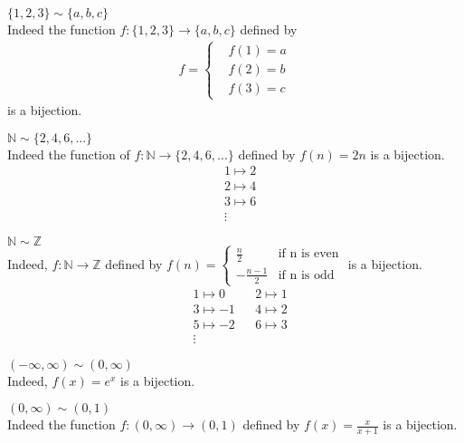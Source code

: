 \begin{example} \leavevmode
    $\{1,2,3\} \sim \{a, b, c\}$ \\
    Indeed the function $f:\{1,2,3\} \rightarrow \{a,b,c\}$ defined by
    \begin{align*}
        f=
        \begin{cases*}
            &f(1)=a \\
            &f(2)=b \\
            &f(3)=c
        \end{cases*}
    \end{align*}
    is a bijection.
\end{example}

\begin{example} \leavevmode
    $\mathbb{N} \sim \{2, 4, 6,...\}$ \\
    Indeed the function of $f:\mathbb{N} \to \{2, 4, 6,...\}$ defined by $f(n)=2n$ is a bijection.
    \begin{align*}
        &1 \mapsto 2 \\
        &2 \mapsto 4 \\
        &3 \mapsto 6\\
        &\vdots
    \end{align*}
\end{example}

\begin{example} \leavevmode
    $\mathbb{N} \sim \mathbb{Z}$ \\
    Indeed, $f: \mathbb{N} \rightarrow \mathbb{Z}$ defined by $f(n)= \begin{cases} \frac{n}{2}&\text{if n is even} \\ -\frac{n-1}{2}&\text{if n is odd} \end{cases}$  is a bijection.
    \begin{align*}
        &1 \mapsto 0 &&2 \mapsto 1 \\
        &3 \mapsto -1 &&4 \mapsto 2 \\
        &5 \mapsto -2 &&6 \mapsto 3 \\
        &\vdots
    \end{align*}
\end{example}

\begin{example} \leavevmode
    $(-\infty, \infty) \sim (0, \infty)$ \\
    Indeed, $f(x)=e^x$ is a bijection.
\end{example}

\begin{example} \leavevmode
    $(0, \infty) \sim (0, 1)$ \\
    Indeed the function $f:(0, \infty) \rightarrow (0, 1)$ defined by $f(x) = \frac{x}{x+1}$ is a bijection.
\end{example}


